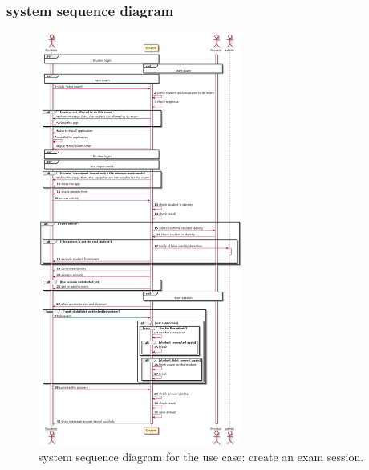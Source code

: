 \documentclass[]{uc2pfecaneva}
\begin{document}
\subsubsection{system sequence diagram}
\begin{figure}[]
	
	\centering
	\includegraphics[width=0.6\textwidth]{images/pass_exam}
	
	\caption{system sequence diagram for the use case: create an exam session.}
\end{figure}
\clearpage
\end{document}
